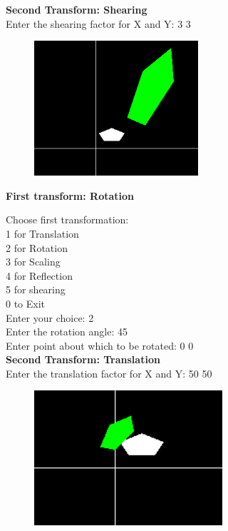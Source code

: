 \documentclass[9pt,letterpaper]{article}
\begin{document}
\newpage

\textbf{\large{Second Transform: Shearing}}\\
Enter the shearing factor for X and Y: 3 3 \\

\begin{figure}[h]
    \centering
    \includegraphics[height=5cm]{CompositeTransformations/Outputs/TranslateShear.png}
\end{figure}

\newpage
\textbf{\Large{First transform: Rotation}}

Choose first transformation: \\
1 for Translation\\
2 for Rotation\\
3 for Scaling\\
4 for Reflection\\
5 for shearing\\
0 to Exit\\
Enter your choice: 2\\
Enter the rotation angle: 45\\
Enter point about which to be rotated: 0 0\\


\textbf{\large{Second Transform: Translation}}\\
Enter the translation factor for X and Y: 50 50 \\

\begin{figure}[h]
    \centering
    \includegraphics[height=5cm]{CompositeTransformations/Outputs/RotateTranslate.png}
\end{figure}
\end{document}
